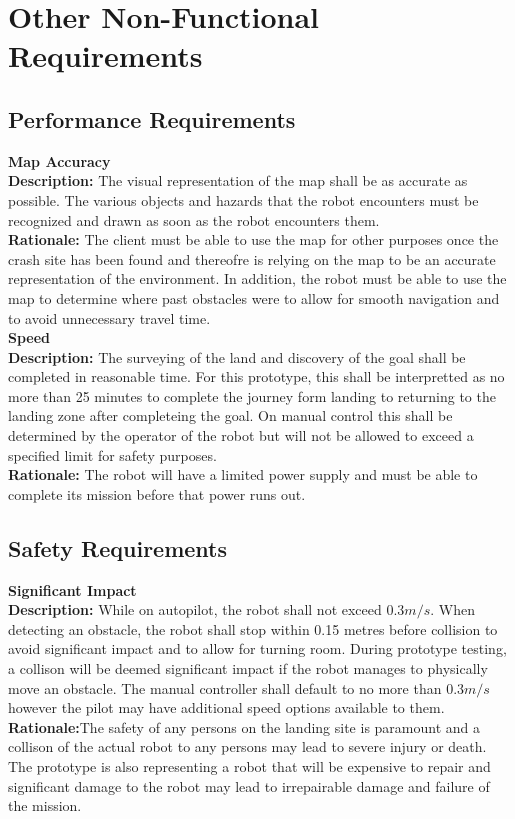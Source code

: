 \documentclass[10pt,a4paper,titlepage]{article}
\begin{document}
	\section{Other Non-Functional Requirements}
	\subsection{Performance Requirements}
		
		\textbf {Map Accuracy}\\
		\textbf {Description:} The visual representation of the map shall be as accurate as possible. The various objects and hazards that the robot encounters must be recognized and drawn as soon as the robot encounters them.\\
		\textbf {Rationale:} The client must be able to use the map for other purposes once the crash site has been found and thereofre is relying on the map to be an accurate representation of the environment. In addition, the robot must be able to use the map to determine where past obstacles were to allow for smooth navigation and to avoid unnecessary travel time.\\

		\textbf {Speed}\\
		\textbf {Description:} The surveying of the land and discovery of the goal shall be completed in reasonable time. For this prototype, this shall be interpretted as no more than 25 minutes to complete the journey form landing to returning to the landing zone after completeing the goal. On manual control this shall be determined by the operator of the robot but will not be allowed to exceed a specified limit for safety purposes.\\
		\textbf {Rationale:} The robot will have a limited power supply and must be able to complete its mission before that power runs out. \\
		
	\subsection{Safety Requirements}
		\textbf {Significant Impact}\\
		\textbf {Description:} While on autopilot, the robot shall not exceed \begin{math}0.3 m/s\end{math}. When detecting an obstacle, the robot shall stop within 0.15 metres before collision to avoid significant impact and to allow for turning room. During prototype testing, a collison will be deemed significant impact if the robot manages to physically move an obstacle. The manual controller shall default to no more than \begin{math}0.3 m/s\end{math} however the pilot may have additional speed options available to them.\\
		\textbf {Rationale:}The safety of any persons on the landing site is paramount and a collison of the actual robot to any persons may lead to severe injury or death. The prototype is also representing a robot that will be expensive to repair and significant damage to the robot may lead to irrepairable damage and failure of the mission.\\
\end{document}
